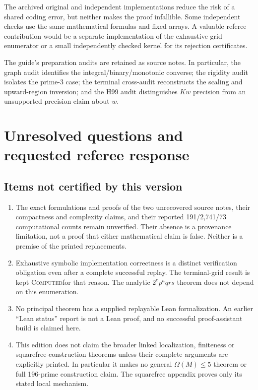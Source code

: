 \documentclass[10pt]{article}
\newcommand{\computed}{\textsc{Computed}}
\begin{document}
The archived original and independent implementations reduce the risk of
a shared coding error, but neither makes the proof infallible. Some
independent checks use the same mathematical formulas and fixed arrays.
A valuable referee contribution would be a separate implementation of
the exhaustive grid enumerator or a small independently checked kernel
for its rejection certificates.

The guide's preparation audits are retained as source notes. In
particular, the graph audit identifies the integral/binary/monotonic
converse; the rigidity audit isolates the prime-$3$ case; the terminal
cross-audit reconstructs the scaling and upward-region inversion; and
the H99 audit distinguishes $Kw$ precision from an unsupported precision
claim about $w$.

\section{Unresolved questions and requested referee response}

\subsection{Items not certified by this version}
\begin{enumerate}
\item The exact formulations and proofs of the two unrecovered source
notes, their compactness and complexity claims, and their reported
191/2,741/73 computational counts remain unverified. Their absence is
a provenance limitation, not a proof that either mathematical claim is
false. Neither is a premise of the printed replacements.
\item Exhaustive symbolic implementation correctness is a distinct
verification obligation even after a complete successful replay. The
terminal-grid result is kept \computed for that reason. The analytic
$2^ep^aqrs$ theorem does not depend on this enumeration.
\item No principal theorem has a supplied replayable Lean
formalization. An earlier ``Lean status'' report is not a Lean proof,
and no successful proof-assistant build is claimed here.
\item This edition does not claim the broader linked localization,
finiteness or squarefree-construction theorems unless their complete
arguments are explicitly printed. In particular it makes no general
$\Omega(M)\le5$ theorem or full 196-prime construction claim. The
squarefree appendix proves only its stated local mechanism.
\end{enumerate}
\end{document}
